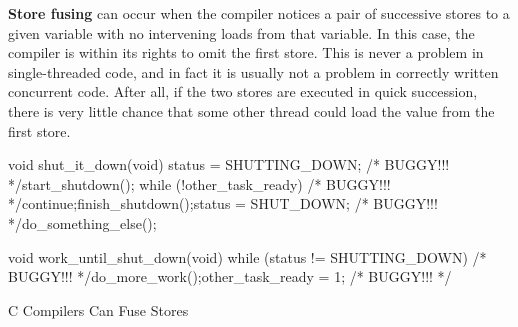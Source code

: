 {\bf Store fusing} can occur when the compiler notices a pair of successive
stores to a given variable with no intervening loads from that variable.
In this case, the compiler is within its rights to omit the first store.
This is never a problem in single-threaded code, and in fact it is
usually not a problem in correctly written concurrent code.
After all, if the two stores are executed in quick succession, there is
very little chance that some other thread could load the value from the
first store.

\begin{listing}[tbp]
\begin{fcvlabel}
\begin{VerbatimL}[commandchars=\\\[\]]
void shut_it_down(void)
{
	status = SHUTTING_DOWN; /* BUGGY!!! */\lnlbl[store:a]
	start_shutdown();
	while (!other_task_ready) /* BUGGY!!! */\lnlbl[loop:b]
		continue;\lnlbl[loop:e]
	finish_shutdown();\lnlbl[finish]
	status = SHUT_DOWN; /* BUGGY!!! */\lnlbl[store:b]
	do_something_else();
}

void work_until_shut_down(void)
{
	while (status != SHUTTING_DOWN) /* BUGGY!!! */
		do_more_work();
	other_task_ready = 1; /* BUGGY!!! */
}
\end{VerbatimL}
\end{fcvlabel}
\caption{C Compilers Can Fuse Stores}
\label{lst:toolsoftrade:C Compilers Can Fuse Stores}
\end{listing}

